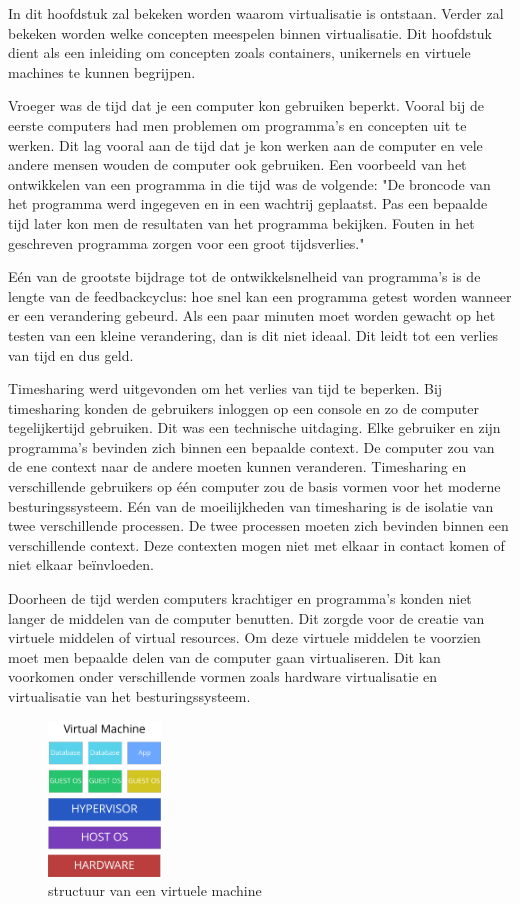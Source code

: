 \documentclass[pdftex,a4paper,12pt,twoside]{report}
\begin{document}
In dit hoofdstuk zal bekeken worden waarom virtualisatie is ontstaan. Verder zal bekeken worden welke concepten meespelen binnen virtualisatie. Dit hoofdstuk dient als een inleiding om concepten zoals containers, unikernels en virtuele machines te kunnen begrijpen.

Vroeger was de tijd dat je een computer kon gebruiken beperkt. Vooral bij de eerste computers had men problemen om programma's en concepten uit te werken. Dit lag vooral aan de tijd dat je kon werken aan de computer en vele andere mensen wouden de computer ook gebruiken. Een voorbeeld van het ontwikkelen van een programma in die tijd was de volgende: "De broncode van het programma werd ingegeven en in een wachtrij geplaatst. Pas een bepaalde tijd later kon men de resultaten van het programma bekijken. Fouten in het geschreven programma zorgen voor een groot tijdsverlies."

Eén van de grootste bijdrage tot de ontwikkelsnelheid van programma's is de lengte van de feedbackcyclus: hoe snel kan een programma getest worden wanneer er een verandering gebeurd. Als een paar minuten moet worden gewacht op het testen van een kleine verandering, dan is dit niet ideaal. Dit leidt tot een verlies van tijd en dus geld.

Timesharing werd uitgevonden om het verlies van tijd te beperken. Bij timesharing konden de gebruikers inloggen op een console en zo de computer tegelijkertijd gebruiken. Dit was een technische uitdaging. Elke gebruiker en zijn programma's bevinden zich binnen een bepaalde context. De computer zou van de ene context naar de andere moeten kunnen veranderen. Timesharing en verschillende gebruikers op één computer zou de basis vormen voor het moderne besturingssysteem. Eén van de moeilijkheden van timesharing is de isolatie van twee verschillende processen. De twee processen moeten zich bevinden binnen een verschillende context. Deze contexten mogen niet met elkaar in contact komen of niet elkaar beïnvloeden.

Doorheen de tijd werden computers krachtiger en programma's konden niet langer de middelen van de computer benutten. Dit zorgde voor de creatie van virtuele middelen of virtual resources. Om deze virtuele middelen te voorzien moet men bepaalde delen van de computer gaan virtualiseren. Dit kan voorkomen onder verschillende vormen zoals hardware virtualisatie en virtualisatie van het besturingssysteem.

\begin{figure}
    \centering
    \includegraphics[width=3cm]{img/virtual-machine}
    \caption{structuur van een virtuele machine}
    \label{fig:virtualmachine}
\end{figure}
\end{document}
